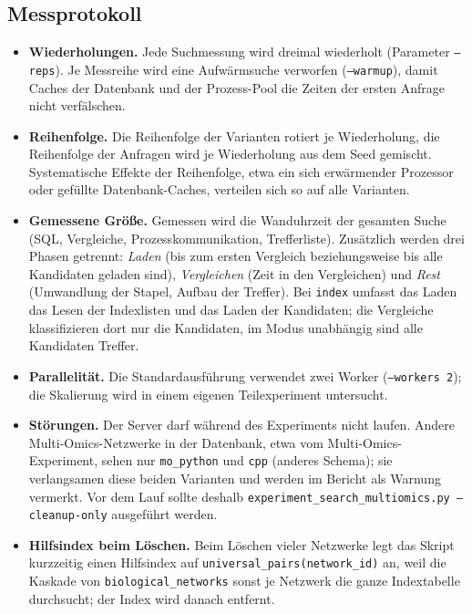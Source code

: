 \documentclass[a4paper,12pt, twoside]{report}
\theoremstyle{definition}
\begin{document}
\subsection{Messprotokoll}

\begin{itemize}
	\item \textbf{Wiederholungen.} Jede Suchmessung wird dreimal wiederholt (Parameter \texttt{--reps}). Je Messreihe wird eine Aufwärmsuche verworfen (\texttt{--warmup}), damit Caches der Datenbank und der Prozess-Pool die Zeiten der ersten Anfrage nicht verfälschen.
	\item \textbf{Reihenfolge.} Die Reihenfolge der Varianten rotiert je Wiederholung, die Reihenfolge der Anfragen wird je Wiederholung aus dem Seed gemischt. Systematische Effekte der Reihenfolge, etwa ein sich erwärmender Prozessor oder gefüllte Datenbank-Caches, verteilen sich so auf alle Varianten.
	\item \textbf{Gemessene Größe.} Gemessen wird die Wanduhrzeit der gesamten Suche (SQL, Vergleiche, Prozesskommunikation, Trefferliste). Zusätzlich werden drei Phasen getrennt: \emph{Laden} (bis zum ersten Vergleich beziehungsweise bis alle Kandidaten geladen sind), \emph{Vergleichen} (Zeit in den Vergleichen) und \emph{Rest} (Umwandlung der Stapel, Aufbau der Treffer). Bei \texttt{index} umfasst das Laden das Lesen der Indexlisten und das Laden der Kandidaten; die Vergleiche klassifizieren dort nur die Kandidaten, im Modus unabhängig sind alle Kandidaten Treffer.
	\item \textbf{Parallelität.} Die Standardausführung verwendet zwei Worker (\texttt{--workers 2}); die Skalierung wird in einem eigenen Teilexperiment untersucht.
	\item \textbf{Störungen.} Der Server darf während des Experiments nicht laufen. Andere Multi-Omics-Netzwerke in der Datenbank, etwa vom Multi-Omics-Experiment, sehen nur \texttt{mo\_python} und \texttt{cpp} (anderes Schema); sie verlangsamen diese beiden Varianten und werden im Bericht als Warnung vermerkt. Vor dem Lauf sollte deshalb \texttt{experiment\_search\_multiomics.py --cleanup-only} ausgeführt werden.
	\item \textbf{Hilfsindex beim Löschen.} Beim Löschen vieler Netzwerke legt das Skript kurzzeitig einen Hilfsindex auf \texttt{universal\_pairs(network\_id)} an, weil die Kaskade von \texttt{biological\_networks} sonst je Netzwerk die ganze Indextabelle durchsucht; der Index wird danach entfernt.
\end{itemize}
\end{document}
